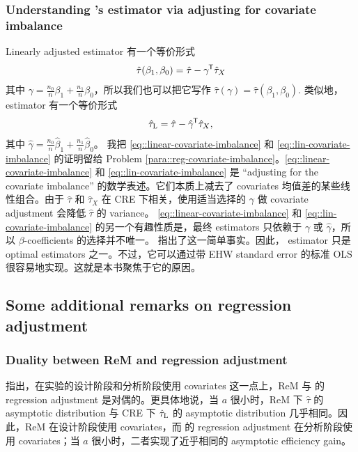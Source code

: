 \subsubsection{Understanding \citet{lin2013}'s estimator via adjusting for covariate imbalance}
\label{sec::lin=adjustingforimbalance}

Linearly adjusted estimator 有一个等价形式
\begin{eqnarray}\label{eq::linear-covariate-imbalance}
\hat{\tau}(\beta_1, \beta_0) = \hat{\tau} - \gamma^{\mkern-1.5mu\mathsf{T}} \hat{\tau}_X 
\end{eqnarray}
其中 $\gamma =\frac{n_0}{n} \beta_1 + \frac{n_1}{n} \beta_0$，所以我们也可以把它写作 $\hat{\tau}(\gamma) = 
\hat{\tau}(\beta_1, \beta_0) .$ 类似地，\citet{lin2013} estimator 有一个等价形式
\begin{eqnarray}\label{eq::lin-covariate-imbalance}
\hat{\tau}_\textsc{L} = \hat{\tau} - \hat \gamma^{\mkern-1.5mu\mathsf{T}} \hat{\tau}_X ,
\end{eqnarray}
其中 $\hat \gamma =\frac{n_0}{n} \hat \beta_1 + \frac{n_1}{n} \hat  \beta_0$。
我把 \eqref{eq::linear-covariate-imbalance} 和 \eqref{eq::lin-covariate-imbalance} 的证明留给 Problem \ref{para::reg-covariate-imbalance}。\eqref{eq::linear-covariate-imbalance} 和 \eqref{eq::lin-covariate-imbalance} 是 ``adjusting for the covariate imbalance'' 的数学表述。它们本质上减去了 covariates 均值差的某些线性组合。由于 $\hat{\tau} $ 和 $\hat{\tau}_X $ 在 CRE 下相关，使用适当选择的 $\gamma$ 做 covariate adjustment 会降低 $\hat{\tau} $ 的 variance。
\eqref{eq::linear-covariate-imbalance} 和 \eqref{eq::lin-covariate-imbalance} 的另一个有趣性质是，最终 estimators 只依赖于 $\gamma$ 或 $\hat \gamma$，所以 $\beta$-coefficients 的选择并不唯一。\citet{li2019rerandomization} 指出了这一简单事实。因此，\citet{lin2013} estimator 只是 optimal estimators 之一。不过，它可以通过带 EHW standard error 的标准 OLS 很容易地实现。这就是本书聚焦于它的原因。

\subsection{Some additional remarks on regression adjustment}

\subsubsection{Duality between ReM and regression adjustment}
\citet{li2018asymptotic} 指出，在实验的设计阶段和分析阶段使用 covariates 这一点上，ReM 与 \citet{lin2013} 的 regression adjustment 是对偶的。更具体地说，当 $a$ 很小时，ReM 下 $\hat{\tau}$ 的 asymptotic distribution 与 CRE 下 $\hat{\tau}_\textsc{L}$ 的 asymptotic distribution 几乎相同。因此，ReM 在设计阶段使用 covariates，而 \citet{lin2013} 的 regression adjustment 在分析阶段使用 covariates；当 $a$ 很小时，二者实现了近乎相同的 asymptotic efficiency gain。

